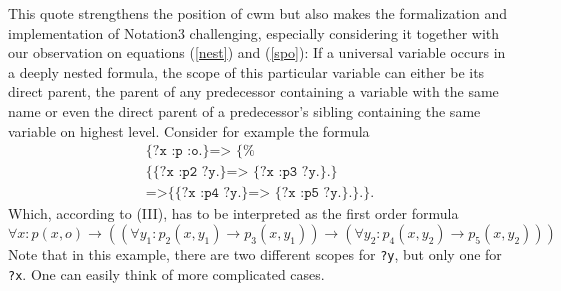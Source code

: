 This quote strengthens the position of cwm but also makes the formalization and implementation of Notation3 challenging, 
especially considering it together with our observation on equations (\ref{nest}) and (\ref{spo}): %
If a universal variable occurs in a deeply
nested formula, the scope of this particular variable can either be its direct parent, the parent of any predecessor containing a variable with the same name
or even the direct parent of a predecessor's sibling containing the same variable on highest level. %
Consider for example the formula
\begin{multline}\label{twovars}
 \texttt{\{?x :p :o.\}=> \{%
 \{\{?x :p2 ?y.\} => \{?x :p3 ?y.\}.\}}\\ \texttt{=>\{\{?x :p4 ?y.\} => \{?x :p5 ?y.\}.\}.\}.}
\end{multline}
Which, according to (III), has to be interpreted as the first order formula 
\[\forall x: p(x,o)\rightarrow ((\forall y_1: p_2(x, y_1) \rightarrow p_3(x, y_1))\rightarrow(\forall y_2: p_4(x, y_2)\rightarrow p_5(x, y_2))) \]
Note that in this example, there are two different scopes for \verb!?y!, but only one for \verb!?x!. One can easily think of more  complicated cases. 



